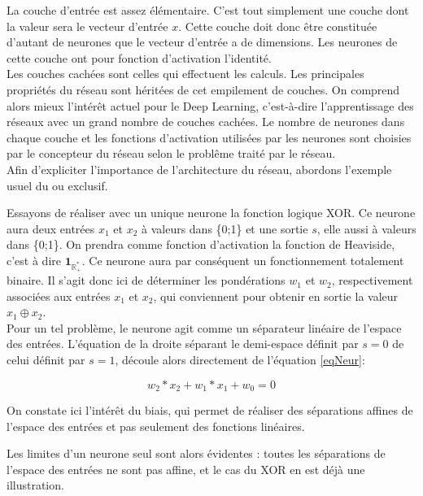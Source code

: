 \documentclass[a4paper,twoside]{report}
\begin{document}
				La couche d'entrée est assez élémentaire. C'est tout simplement une couche dont la valeur sera le vecteur d'entrée $x$. Cette couche doit donc être constituée d'autant de neurones que le vecteur d'entrée a de dimensions. Les neurones de cette couche ont pour fonction d'activation l'identité.\\

				Les couches cachées sont celles qui effectuent les calculs. Les principales propriétés du réseau sont héritées de cet empilement de couches. On comprend alors mieux l'intérêt actuel pour le Deep Learning, c'est-à-dire l'apprentissage des réseaux avec un grand nombre de couches cachées.
				Le nombre de neurones dans chaque couche et les fonctions d'activation utilisées par les neurones sont choisies par le concepteur du réseau selon le problême traité par le réseau.\\

				Afin d'expliciter l'importance de l'architecture du réseau, abordons l'exemple usuel du ou exclusif.

				Essayons de réaliser avec un unique neurone la fonction logique XOR. Ce neurone aura deux entrées $x_{1}$ et $x_{2}$ à valeurs dans \{0;1\} et une sortie $s$, elle aussi à valeurs dans \{0;1\}. On prendra comme fonction d'activation la fonction de Heaviside, c'est à dire $\mathbf{1}_{\mathbb{R}^{*}_{+}}$. Ce neurone aura par conséquent un fonctionnement totalement binaire. Il s'agit donc ici de déterminer les pondérations $w_{1}$ et $w_{2}$, respectivement associées aux entrées $x_{1}$ et $x_{2}$, qui conviennent pour obtenir en sortie la valeur $x_{1}\oplus x_{2}$.\\

				Pour un tel problème, le neurone agit comme un séparateur linéaire de l'espace des entrées. L'équation de la droite séparant le demi-espace définit par $s=0$ de celui définit par $s=1$, découle alors directement de l'équation \ref{eqNeur}:

				\begin{equation}w_{2}*x_{2}+w_{1}*x_{1}+w_{0}=0\end{equation}

				On constate ici l'intérêt du biais, qui permet de réaliser des séparations affines de l'espace des entrées et pas seulement des fonctions linéaires.

				Les limites d'un neurone seul sont alors évidentes : toutes les séparations de l'espace des entrées ne sont pas affine, et le cas du XOR en est déjà une illustration.\\
\end{document}

